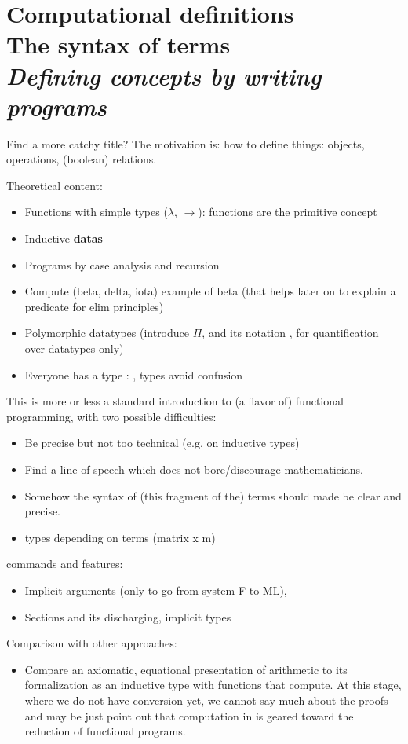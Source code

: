 \chapter{Computational definitions \\ The syntax of terms \\[2ex]\Large\itshape Defining concepts by writing programs}

Find a more catchy title? The motivation is: how to define things:
objects, operations, (boolean) relations.

Theoretical content:
\begin{itemize}
\item Functions with simple types ($\lambda$, $\rightarrow$): functions are the primitive concept
\item Inductive {\bf datas}
\item Programs by case analysis and recursion
\item Compute (beta, delta, iota) example of beta (that helps later on to explain a predicate for elim principles)
\item Polymorphic datatypes (introduce $\Pi$, and its \Coq{} notation
  , for quantification over datatypes only)
\item Everyone has a type : , types avoid confusion
\end{itemize}
This is more or less a standard introduction to (a flavor of)
functional programming, with two possible difficulties:
\begin{itemize}
\item Be precise but not too technical (e.g. on inductive types)
\item Find a line of speech which does not bore/discourage
  mathematicians.
\item Somehow the syntax of (this fragment of the) terms should made
  be clear and precise.
 \item types depending on terms (matrix x m)
\end{itemize}

\Coq{} commands and features:
\begin{itemize}
\item Implicit arguments (only to go from system F to ML), 
\item Sections and its discharging, implicit types
\end{itemize}

Comparison with other approaches:
\begin{itemize}
\item Compare an axiomatic, equational presentation of arithmetic to
  its formalization as an inductive type with functions that
  compute. At this stage, where we do not have conversion yet, we
  cannot say much about the proofs and may be just point out that
  computation in \Coq{} is geared toward the reduction of functional
  programs.
\end{itemize}

